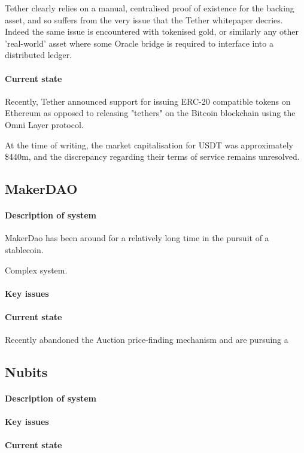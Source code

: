 \documentclass{article}
\begin{document}
Tether clearly relies on a manual, centralised proof of existence for the backing asset, and so suffers from the very issue that the Tether whitepaper decries. Indeed the same issue is encountered with tokenised gold, or similarly any other 'real-world' asset where some Oracle bridge is required to interface into a distributed ledger.

\paragraph{Current state}

Recently, Tether announced support for issuing ERC-20 compatible tokens on Ethereum as opposed to releasing "tethers" on the Bitcoin blockchain using the Omni Layer protocol.

At the time of writing, the market capitalisation for USDT was approximately \$440m, and the discrepancy regarding their terms of service remains unresolved.


\subsection{MakerDAO}

\paragraph{Description of system}

MakerDao has been around for a relatively long time in the pursuit of a stablecoin.

Complex system.

\paragraph{Key issues}

\paragraph{Current state}

Recently abandoned the Auction price-finding mechanism and are pursuing a 


\subsection{Nubits}

\paragraph{Description of system}

\paragraph{Key issues}

\paragraph{Current state}



\pagebreak


\end{document}
